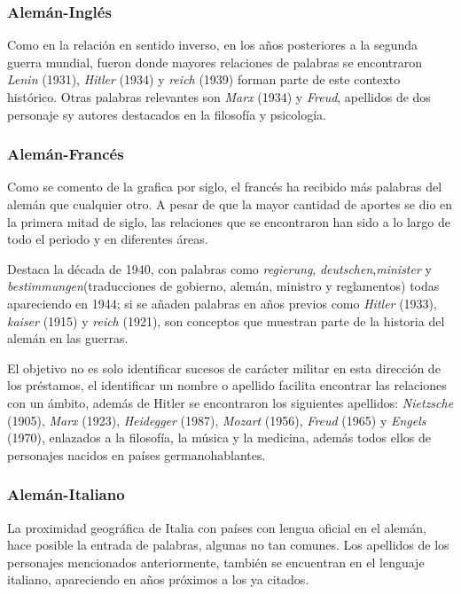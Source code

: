 \subsubsection*{Alemán-Inglés}%

Como en la relación en sentido inverso, en los años posteriores a la segunda guerra mundial,  fueron donde mayores relaciones de palabras se encontraron  \textit{Lenin} (1931), \textit{Hitler} (1934) y \textit{reich} (1939) forman parte  de este contexto histórico.  Otras palabras relevantes son \textit{Marx} (1934) y \textit{Freud}, apellidos de dos personaje sy autores destacados en la filosofía y psicología. 


\subsubsection*{Alemán-Francés}%

Como se comento de la grafica por siglo, el francés ha recibido más palabras del alemán que cualquier otro. A pesar de que la mayor cantidad de aportes se dio en la primera mitad de siglo, las relaciones que se encontraron han sido a lo largo de todo el periodo y en diferentes áreas. 

Destaca la década de 1940, con palabras como \textit{regierung},  \textit{deutschen},\textit{minister} y  \textit{bestimmungen}(traducciones de gobierno, alemán, ministro y reglamentos) todas apareciendo en 1944;  si se añaden palabras en años previos como \textit{Hitler} (1933), \textit{kaiser} (1915) y \textit{reich} (1921), son conceptos que muestran parte de la historia del alemán en las guerras. 

El objetivo no es solo identificar sucesos de carácter militar en esta dirección de los préstamos, el identificar un nombre o apellido facilita encontrar las relaciones con un ámbito,  además de Hitler se encontraron los siguientes apellidos:  \textit{Nietzsche} (1905),  \textit{Marx} (1923), \textit{Heidegger} (1987),  \textit{Mozart} (1956), \textit{Freud} (1965) y \textit{Engels} (1970), enlazados a la filosofía, la música y la medicina,  además todos ellos de personajes nacidos en países germanohablantes.


\subsubsection*{Alemán-Italiano}%

La proximidad geográfica de Italia con países con lengua oficial en el alemán, hace posible la entrada de palabras, algunas no tan comunes.  Los apellidos de los personajes mencionados anteriormente, también se encuentran en el lenguaje italiano, apareciendo en años próximos a los ya citados.  

